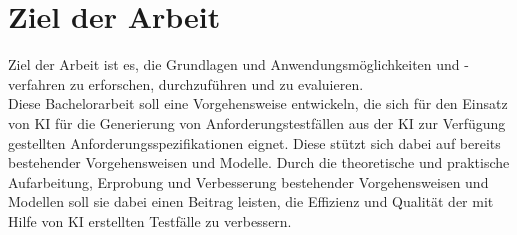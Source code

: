\documentclass[12pt,toc=bib,toc=listof]{scrreprt}
\begin{document}
\section{Ziel der Arbeit} %
\label{sec:zielDerArbeit}
Ziel der Arbeit ist es, die Grundlagen und Anwendungsmöglichkeiten und -verfahren zu erforschen, durchzuführen und zu evaluieren.\\
Diese Bachelorarbeit soll eine Vorgehensweise entwickeln, die sich für den Einsatz von KI für die Generierung von Anforderungstestfällen aus der KI zur Verfügung gestellten Anforderungsspezifikationen eignet. Diese stützt sich dabei auf bereits bestehender Vorgehensweisen und Modelle. Durch die theoretische und praktische Aufarbeitung, Erprobung und Verbesserung bestehender Vorgehensweisen und Modellen soll sie dabei einen Beitrag leisten, die Effizienz und Qualität der mit Hilfe von KI erstellten Testfälle zu verbessern.
\end{document}
